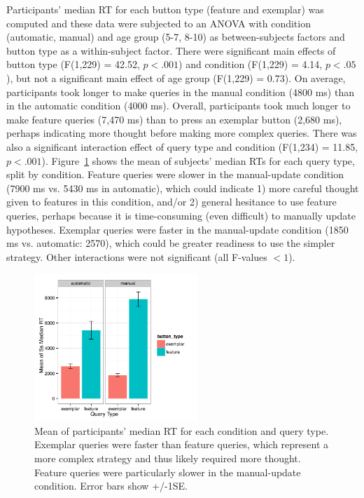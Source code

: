 \documentclass[man,floatsintext]{apa6}
\begin{document}
Participants' median RT for each button type (feature and exemplar) was computed and these data were subjected to an ANOVA with condition (automatic, manual) and age group (5-7, 8-10) as 
between-subjects factors and button type as a within-subject factor. There
were significant main effects of button type (F(1,229) = 42.52, $p<.
001$) and condition (F(1,229) = 4.14, $p<.05$), but not a significant main effect of age group (F(1,229) = 0.73). On average, participants took longer to make queries in the manual 
condition (4800 ms) than in the automatic condition (4000 ms). Overall, participants took much 
longer to make feature queries (7,470 ms) than to press an exemplar button (2,680 ms), 
perhaps indicating more thought before making more complex queries. There was also a significant 
interaction effect of query type and condition (F(1,234) = 11.85, $p<.001$). Figure~\ref{fig:basic-rt} shows 
the mean of subjects' median RTs for each query type, split by condition. Feature queries were 
slower in the manual-update condition (7900 ms vs. 5430 ms in automatic), which could indicate 
1) more careful thought given to features in this condition, and/or 2) general hesitance to use feature 
queries, perhaps because it is time-consuming (even difficult) to manually update hypotheses. 
Exemplar queries were faster in the manual-update condition (1850 ms vs. automatic: 2570),
which could be greater readiness to use the simpler strategy. Other interactions were not significant (all F-values $<1$).

\begin{figure}[h]
  \centering
  \includegraphics[width=0.55\textwidth]{figures/RT_by_condition_query_type}
  \caption{Mean of participants' median RT for each condition and query type. 
Exemplar queries were faster than feature queries, which represent a more complex 
strategy and thus likely required more thought. Feature queries were particularly slower in the 
manual-update condition. Error bars show +/-1SE.}
  \label{fig:basic-rt}
\end{figure} 
\end{document}
